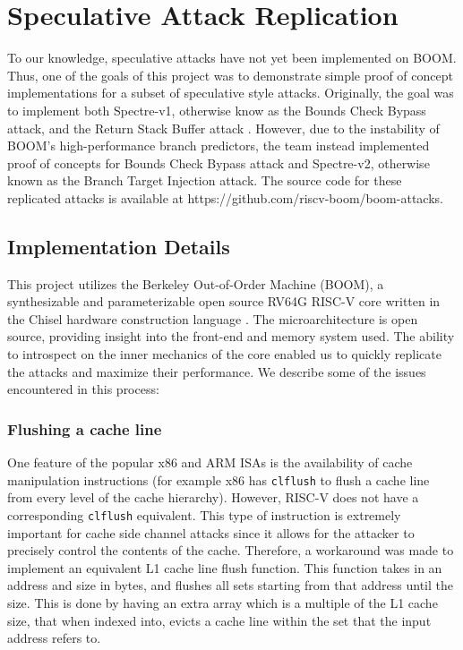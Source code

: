 \section{Speculative Attack Replication}

To our knowledge, speculative attacks have not yet been implemented on BOOM. Thus,
one of the goals of this project was to demonstrate simple proof of concept implementations for a
subset of speculative style attacks. Originally, the goal was to implement both 
Spectre-v1, otherwise know as the Bounds Check Bypass attack, and the Return Stack Buffer attack \cite{b3}.
However, due to the instability of BOOM's high-performance branch predictors, the team instead implemented
proof of concepts for Bounds Check Bypass attack and Spectre-v2, otherwise known as the
Branch Target Injection attack. The source code for these replicated attacks is available at
https://github.com/riscv-boom/boom-attacks.

\subsection{Implementation Details}

This project utilizes the Berkeley Out-of-Order Machine (BOOM), a synthesizable and 
parameterizable open source RV64G RISC-V core written in the Chisel hardware construction language \cite{b49}. 
The microarchitecture is open source, providing insight into the front-end and memory system
used. The ability to introspect on the inner mechanics of the core enabled us to quickly replicate 
the attacks and maximize their performance. We describe some of the issues encountered in this process:

\subsubsection{Flushing a cache line}


One feature of the popular x86 and ARM ISAs is the availability of cache manipulation instructions
(for example x86 has {\tt clflush} to flush a cache line from every level of the cache hierarchy).
However, RISC-V does not have a corresponding {\tt clflush} equivalent.
This type of instruction is extremely important for cache side channel attacks since it allows for
the attacker to precisely control the contents of the cache.
Therefore, a workaround was made to implement an equivalent
L1 cache line flush function. This function takes in an address and size in bytes, and flushes
all sets starting from that address until the size. This is done by having an extra array which 
is a multiple of the L1 cache size, that when indexed into, evicts a cache line within the set that the input
address refers to.

